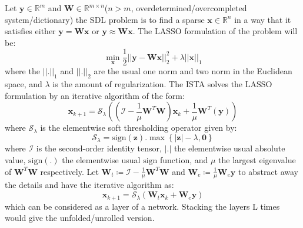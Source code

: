Let $\boldsymbol{y} \in \mathbb{R}^m$ and $\boldsymbol{W} \in \mathbb{R}^{m \times n}$($n > m$, overdetermined/overcompleted system/dictionary)
the \ac{SDL} problem is to find a sparse $\boldsymbol{x} \in \mathbb{R}^n$ in a way that it satisfies either $\boldsymbol{y} = \boldsymbol{W}\boldsymbol{x}$ or $\boldsymbol{y} \approx \boldsymbol{W}\boldsymbol{x}$.
The \ac{LASSO}\cite{Hastie2009} formulation of the problem will be:
\begin{equation*}
  \min_{\boldsymbol{x}} \frac{1}{2} \left|\left|\boldsymbol{y}-\boldsymbol{W}\boldsymbol{x}\right|\right|_2^2 + \lambda \left|\left|\boldsymbol{x}\right|\right|_1
\end{equation*}
where the $\left|\left|\boldsymbol{.}\right|\right|_1$ and $\left|\left|\boldsymbol{.}\right|\right|_2$ are the usual one norm\cite{Alt2016} and two norm\cite{Alt2016} in the Euclidean space, and $\lambda$ is the amount of regularization\cite{Hastie2009}. 
The \ac{ISTA}\cite{Daubechies2003} solves the \ac{LASSO}\cite{Hastie2009} formulation by an iterative algorithm of the form:
\begin{equation*}
  \boldsymbol{x}_{k+1} = \mathcal{S}_\lambda\left(\left(\mathcal{I}-\frac{1}{\mu}\boldsymbol{W}^T\boldsymbol{W}\right)\boldsymbol{x}_k+\frac{1}{\mu}\boldsymbol{W}^T\left(\boldsymbol{y}\right)\right)
\end{equation*}
where $\mathcal{S}_\lambda$ is the elementwise soft thresholding operator given by:
\begin{equation*}
  \mathcal{S}_\lambda = \mathrm{sign}(\boldsymbol{z}) \boldsymbol{.} \max \left\{\left|\boldsymbol{z}\right|-\lambda,\boldsymbol{0}\right\}
\end{equation*}
where $\mathcal{I}$ is the second-order identity tensor\cite{Hackbusch2019}, $\left|\boldsymbol{.}\right|$ the elementwise usual absolute value, 
$\mathrm{sign}(\boldsymbol{.})$ the elementwise usual $\mathrm{sign}$ function, and $\mu$ the largest eigenvalue \cite{Hackbusch2019} 
 of $\boldsymbol{W}^T\boldsymbol{W}$ respectively.
Let $\boldsymbol{W}_t \coloneqq \mathcal{I}-\frac{1}{\mu}\boldsymbol{W}^T\boldsymbol{W}$ and 
$\boldsymbol{W}_e \coloneqq \frac{1}{\mu}\boldsymbol{W}_e\boldsymbol{y}$ to abstract away the details and have the iterative algorithm 
as:
\begin{equation*}
  \boldsymbol{x}_{k+1} = \mathcal{S}_\lambda\left(\boldsymbol{W}_t\boldsymbol{x}_{k}+\boldsymbol{W}_e\boldsymbol{y}\right)
\end{equation*}
which can be considered as a layer of a network. Stacking the layers $\mathrm{L}$ times would give the unfolded/unrolled version.

